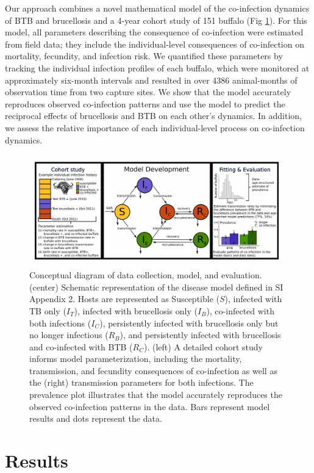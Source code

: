 \documentclass[10pt,letterpaper]{article}
\begin{document}
Our approach combines a novel mathematical model of the co-infection dynamics of BTB and brucellosis and a 4-year cohort study of 151 buffalo (Fig \ref{fig:fig1}). For this model, all parameters describing the consequence of co-infection were estimated from field data; they include the individual-level consequences of co-infection on mortality, fecundity, and infection risk. We quantified these parameters by tracking the individual infection profiles of each buffalo, which were monitored at approximately six-month intervals and resulted in over 4386 animal-months of observation time from two capture sites. We show that the model accurately reproduces observed co-infection patterns and use the model to predict the reciprocal effects of brucellosis and BTB on each other’s dynamics. In addition, we assess the relative importance of each individual-level process on co-infection dynamics.

\begin{figure} [hb] %
\centering
\includegraphics[width=14cm]{Figure1.pdf}
\caption{Conceptual diagram of data collection, model, and evaluation. (center) Schematic representation of the disease model defined in SI Appendix 2. Hosts are represented as Susceptible ($S$), infected with TB only ($I_T$), infected with brucellosis only ($I_B$), co-infected with both infections ($I_C$), persistently infected with brucellosis only but no longer infectious ($R_B$), and persistently infected with brucellosis and co-infected with BTB ($R_C$). (left) A detailed cohort study informs model parameterization, including the mortality, transmission, and fecundity consequences of co-infection as well as the (right) transmission parameters for both infections. The prevalence plot illustrates that the model accurately reproduces the observed co-infection patterns in the data.  Bars represent model results and dots represent the data.}
\label{fig:fig1}
\end{figure}


\section*{Results}
\end{document}
